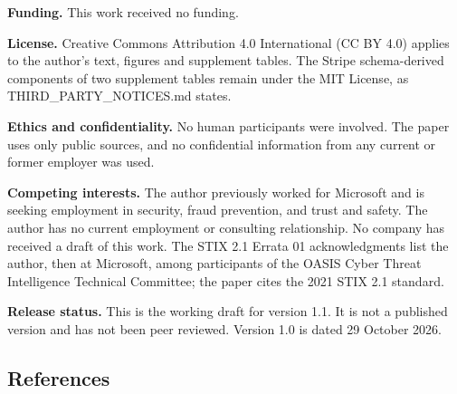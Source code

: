 \documentclass[
  11pt,
]{article}
\begin{document}
\textbf{Funding.} This work received no funding.

\textbf{License.} Creative Commons Attribution 4.0 International (CC BY
4.0) applies to the author's text, figures and supplement tables. The
Stripe schema-derived components of two supplement tables remain under
the MIT License, as THIRD\_PARTY\_NOTICES.md states.

\textbf{Ethics and confidentiality.} No human participants were
involved. The paper uses only public sources, and no confidential
information from any current or former employer was used.

\textbf{Competing interests.} The author previously worked for Microsoft
and is seeking employment in security, fraud prevention, and trust and
safety. The author has no current employment or consulting relationship.
No company has received a draft of this work. The STIX 2.1 Errata 01
acknowledgments list the author, then at Microsoft, among participants
of the OASIS Cyber Threat Intelligence Technical Committee; the paper
cites the 2021 STIX 2.1 standard.

\textbf{Release status.} This is the working draft for version 1.1. It
is not a published version and has not been peer reviewed. Version 1.0
is dated 29 October 2026.

\FloatBarrier

\hypertarget{references}{%
\subsection{References}\label{references}}

\suppressfloats[t]
\end{document}
